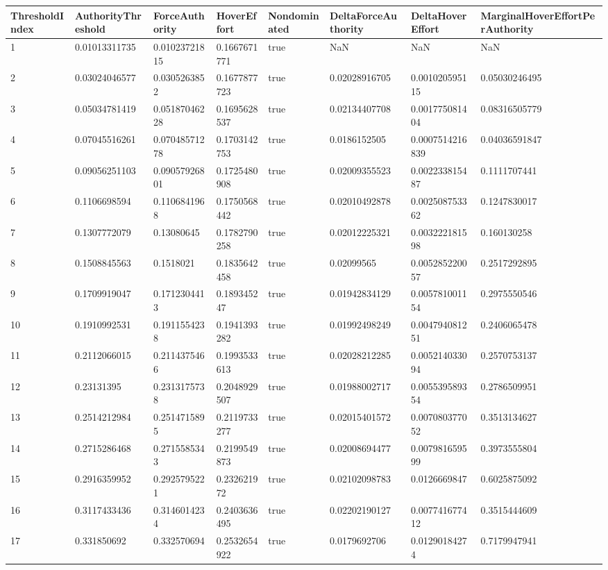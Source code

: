 \begin{tabular}{@{}llllllll@{}}
\toprule
ThresholdIndex & AuthorityThreshold & ForceAuthority & HoverEffort & Nondominated & DeltaForceAuthority & DeltaHoverEffort & MarginalHoverEffortPerAuthority \\
\midrule
1 & 0.01013311735 & 0.01023721815 & 0.1667671771 & true & NaN & NaN & NaN \\
2 & 0.03024046577 & 0.0305263852 & 0.1677877723 & true & 0.02028916705 & 0.001020595115 & 0.05030246495 \\
3 & 0.05034781419 & 0.05187046228 & 0.1695628537 & true & 0.02134407708 & 0.001775081404 & 0.08316505779 \\
4 & 0.07045516261 & 0.07048571278 & 0.1703142753 & true & 0.0186152505 & 0.0007514216839 & 0.04036591847 \\
5 & 0.09056251103 & 0.09057926801 & 0.1725480908 & true & 0.02009355523 & 0.002233815487 & 0.1111707441 \\
6 & 0.1106698594 & 0.1106841968 & 0.1750568442 & true & 0.02010492878 & 0.002508753362 & 0.1247830017 \\
7 & 0.1307772079 & 0.13080645 & 0.1782790258 & true & 0.02012225321 & 0.003222181598 & 0.160130258 \\
8 & 0.1508845563 & 0.1518021 & 0.1835642458 & true & 0.02099565 & 0.005285220057 & 0.2517292895 \\
9 & 0.1709919047 & 0.1712304413 & 0.189345247 & true & 0.01942834129 & 0.005781001154 & 0.2975550546 \\
10 & 0.1910992531 & 0.1911554238 & 0.1941393282 & true & 0.01992498249 & 0.004794081251 & 0.2406065478 \\
11 & 0.2112066015 & 0.2114375466 & 0.1993533613 & true & 0.02028212285 & 0.005214033094 & 0.2570753137 \\
12 & 0.23131395 & 0.2313175738 & 0.2048929507 & true & 0.01988002717 & 0.005539589354 & 0.2786509951 \\
13 & 0.2514212984 & 0.2514715895 & 0.2119733277 & true & 0.02015401572 & 0.007080377052 & 0.3513134627 \\
14 & 0.2715286468 & 0.2715585343 & 0.2199549873 & true & 0.02008694477 & 0.007981659599 & 0.3973555804 \\
15 & 0.2916359952 & 0.2925795221 & 0.232621972 & true & 0.02102098783 & 0.0126669847 & 0.6025875092 \\
16 & 0.3117433436 & 0.3146014234 & 0.2403636495 & true & 0.02202190127 & 0.007741677412 & 0.3515444609 \\
17 & 0.331850692 & 0.332570694 & 0.2532654922 & true & 0.0179692706 & 0.01290184274 & 0.7179947941 \\

\end{tabular}
